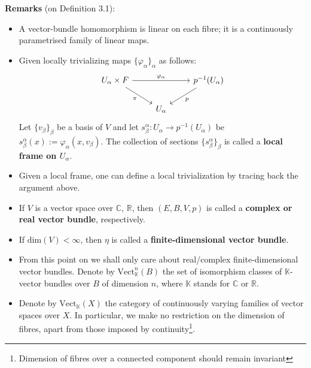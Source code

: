 \documentclass[11pt,a4paper]{article}
\begin{document}
\textbf{Remarks} (on Definition 3.1):
    \begin{itemize}
        \item A vector-bundle homomorphism is linear on each fibre; it is a continuously parametrised family of linear maps.
        \item Given locally trivializing maps $\{\varphi_{\alpha}\}_{\alpha}$ as follows:
        $$\begin{tikzcd}
        U_{\alpha}\cross F \arrow[rd, "\pi"'] \arrow[rr, "\varphi_{\alpha}"]
        &&p^{-1}(U_{\alpha}) \arrow[ld, "p"] \\
        & U_{\alpha}
    \end{tikzcd}$$
    Let $\{v_{\beta}\}_{\beta}$ be a basis of $V$ and let $s_{\beta}^{\alpha}:U_{\alpha}\to p^{-1}(U_{\alpha})$ be $s_{\beta}^{\alpha}(x):= \varphi_{\alpha}(x, v_{\beta})$. The collection of sections $\{s_{\beta}^{\alpha}\}_{\beta}$ is called a \textbf{local frame on $U_{\alpha}$}.
    \item Given a local frame, one can define a local trivialization by tracing back the argument above.
    \item If $V$ is a vector space over $\mathbb{C}$, $\mathbb{R}$, then $(E, B, V, p)$ is called a \textbf{complex or real vector bundle}, respectively.
    \item If $\text{dim}(V) < \infty$, then $\eta$ is called a \textbf{finite-dimensional vector bundle}.
    \item From this point on we shall only care about real/complex finite-dimensional vector bundles. Denote by $\text{Vect}_{\mathbb{K}}^n(B)$ the set of isomorphism classes of $\mathbb{K}$-vector bundles over $B$ of dimension $n$, where $\mathbb{K}$ stands for $\mathbb{C}$ or $\mathbb{R}$.
    \item Denote by $\text{Vect}_{\mathbb{K}}(X)$ the category of continuously varying families of vector spaces over $X$. In particular, we make no restriction on the dimension of fibres, apart from those imposed by continuity\footnote{Dimension of fibres over a connected component should remain invariant}.
    \end{itemize}

\end{document}
